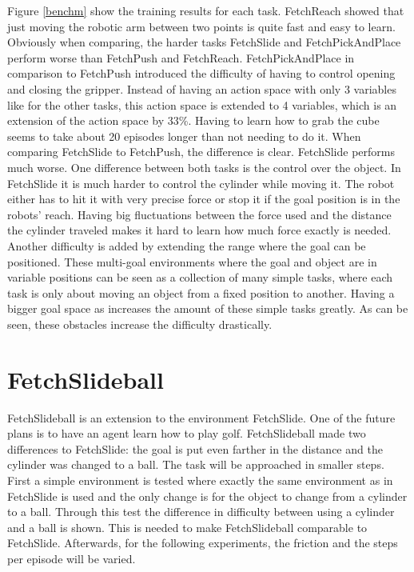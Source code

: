 Figure \ref{benchm} show the training results for each task.
FetchReach showed that just moving the robotic arm between two points is quite fast and easy to learn.
\newline
Obviously when comparing, the harder tasks FetchSlide and FetchPickAndPlace perform worse than FetchPush and FetchReach. FetchPickAndPlace in comparison to FetchPush introduced the difficulty of having to control opening and closing the gripper. Instead of having an action space with only 3 variables like for the other tasks, this action space is extended to 4 variables, which is an extension of the action space by 33\%. Having to learn how to grab the cube seems to take about 20 episodes longer than not needing to do it. 
\newline
When comparing FetchSlide to FetchPush, the difference is clear. FetchSlide performs much worse. 
\newline
One difference between both tasks is the control over the object. In FetchSlide it is much harder to control the cylinder while moving it. The robot either has to hit it with very precise force or stop it if the goal position is in the robots' reach. Having big fluctuations between the force used and the distance the cylinder traveled makes it hard to learn how much force exactly is needed. 
\newline
Another difficulty is added by extending the range where the goal can be positioned. These multi-goal environments where the goal and object are in variable positions can be seen as a collection of many simple tasks, where each task is only about moving an object from a fixed position to another. Having a bigger goal space as increases the amount of these simple tasks greatly. As can be seen, these obstacles increase the difficulty drastically. 




\section{FetchSlideball}

FetchSlideball is an extension to the environment FetchSlide. One of the future plans is to have an agent learn how to play golf. FetchSlideball made two differences to FetchSlide: the goal is put even farther in the distance and the cylinder was changed to a ball.
The task will be approached in smaller steps. 
First a simple environment is tested where exactly the same environment as in FetchSlide is used and the only change is for the object to change from a cylinder to a ball. Through this test the difference in difficulty between using a cylinder and a ball is shown. This is needed to make FetchSlideball comparable to FetchSlide. 
Afterwards, for the following experiments, the friction and the steps per episode will be varied. 

